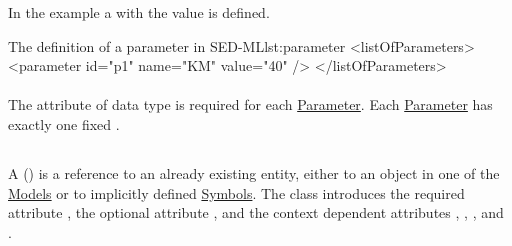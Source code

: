 In the example a   with the value  is defined. 
\begin{myXmlLst}{The definition of a parameter in SED-ML}{lst:parameter}
<listOfParameters>
	<parameter id="p1" name="KM" value="40" />
</listOfParameters>
\end{myXmlLst}


\paragraph*{}
\label{sec:value}
The  attribute of data type  is required for each \hyperref[class:parameter]{Parameter}. Each \hyperref[class:parameter]{Parameter} has exactly one fixed .

\subsection{}
\label{class:variable}
A  () is a reference to an already existing entity, either to an object in one of the \hyperref[class:model]{Models} or to implicitly defined \hyperref[sec:symbol]{Symbols}. The  class introduces the required attribute \hyperref[sec:id]{}, the optional attribute \hyperref[sec:name]{}, and the context dependent attributes \hyperref[sec:target]{}, \hyperref[sec:symbol]{}, \hyperref[sec:taskReferenceAttribute]{}, and \hyperref[sec:modelReferenceAttribute]{}.

